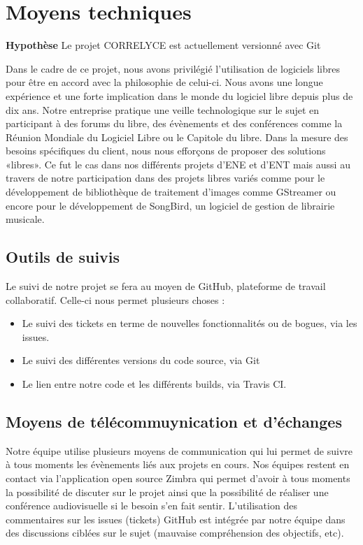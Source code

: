 \section{Moyens techniques}
\begin{exemple}
\textbf{Hypothèse} Le projet CORRELYCE est actuellement versionné avec Git 
\end{exemple}
Dans le cadre de ce projet, nous avons privilégié l’utilisation de logiciels libres pour être en accord avec la philosophie de celui-ci. 
Nous avons une longue expérience et une forte implication dans le monde du logiciel libre depuis plus de dix ans.
Notre entreprise pratique une veille technologique sur le sujet en participant à des forums du libre, des évènements et des conférences comme la Réunion Mondiale du Logiciel Libre ou le Capitole du libre. Dans la mesure des besoins spécifiques du client, nous nous efforçons de proposer des solutions «libres».  Ce fut le cas dans nos différents projets d’ENE et d’ENT mais aussi au travers de notre participation dans des projets libres variés comme pour le développement de bibliothèque de traitement d’images comme GStreamer ou encore pour le développement de SongBird, un logiciel de gestion de librairie musicale. 

	\subsection{Outils de suivis}
	Le suivi de notre projet se fera au moyen de GitHub, plateforme de travail collaboratif. Celle-ci nous permet plusieurs choses : 
	
	\begin{itemize}
		\item Le suivi des tickets en terme de nouvelles fonctionnalités ou de bogues, via les issues.
		\item Le suivi des différentes versions du code source, via Git
		\item Le lien entre notre code et les différents builds, via Travis CI.
	\end{itemize}
		
	\subsection{Moyens de télécommuynication et d'échanges}
	Notre équipe utilise plusieurs moyens de communication qui lui permet de suivre à tous moments les évènements liés aux projets en cours. Nos équipes restent en contact via l’application open source Zimbra qui permet d’avoir à tous moments la possibilité de discuter sur le projet ainsi que la possibilité de réaliser une conférence audiovisuelle si le besoin s’en fait sentir.
	L’utilisation des commentaires sur les issues (tickets) GitHub est intégrée par notre équipe dans des discussions ciblées sur le sujet (mauvaise compréhension des objectifs, etc).
	
